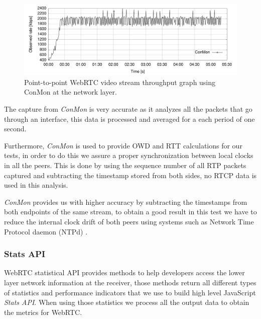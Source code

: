  \begin{figure}[h]
  \centering
    \includegraphics[width=1\textwidth]{./figures/onetooneWiFiConMon.pdf}
      \caption[Point-to-point WebRTC video stream throughput graph using ConMon at the network layer]{Point-to-point WebRTC video stream throughput graph using ConMon at the network layer.}
	\label{fig:onetooneWifiRTCConMon}
\end{figure}

The capture from {\it ConMon} is very accurate as it analyzes all the packets that go through an interface, this data is processed and averaged for a each period of one second. 


Furthermore, {\it ConMon} is used to provide OWD and RTT calculations for our tests, in order to do this we assure a proper synchronization between local clocks in all the peers. This is done by using the sequence number of all RTP packets captured and subtracting the timestamp stored from both sides, no RTCP data is used in this analysis.

{\it ConMon} provides us with higher accuracy by subtracting the timestamps from both endpoints of the same stream, to obtain a good result in this test we have to reduce the internal clock drift of both peers using systems such as Network Time Protocol daemon (NTPd) .

\subsubsection{Stats API}

WebRTC statistical API provides methods to help developers access the lower layer network information at the receiver, those methods return all different types of statistics and performance indicators that we use to build high level JavaScript {\it Stats API}. When using those statistics we process all the output data to obtain the metrics for WebRTC.

